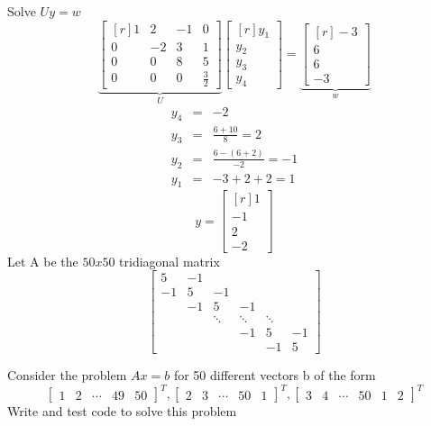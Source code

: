 \documentclass{jhwhw}
\begin{document}
Solve \(Uy = w\)
\[
   \underbrace{\begin{bmatrix*}[r]
	  1     &    2    &    -1   &  0 \\
	  0     &   -2    &     3   &  1 \\
	  0     &    0    &     8   &  5 \\
	  0     &    0    &     0   &  \frac{3}{2} 
	\end{bmatrix*}}_{U}
	\begin{bmatrix*}[r]
	   y_1  \\
	   y_2  \\
	   y_3  \\
	   y_4 
	\end{bmatrix*}
	 =
	\underbrace{\begin{bmatrix*}[r]
	   -3  \\
	    6  \\
	    6  \\
	   -3 
	 \end{bmatrix*}}_{w}
\]
\begin{eqnarray*}
  y_4 &=& -2 \nonumber \\
  y_3 &=& \frac{6+10}{8}  = 2\nonumber \\
  y_2 &=& \frac{6 - (6+2)}{-2}  = -1\nonumber \\
  y_1 &=& -3 + 2 + 2 = 1\nonumber 
\end{eqnarray*}
\[
y
	 =
	\begin{bmatrix*}[r]
	    1  \\
	   -1  \\
	    2  \\
	   -2 
	 \end{bmatrix*}
\]
\problem{}
Let A be the \(50x50\) tridiagonal matrix
\[
\begin{bmatrix*}
 5& -1 &  &  &  & \\ 
-1 & 5 & -1 &  &  &\\ 
  & -1 & 5 & -1 &  &\\ 
 &  &  \ddots & \ddots & \ddots & \\ 
 &  &  & -1 & 5 & -1 \\ 
 &  &  &  &  -1 & 5
\end{bmatrix*}
\]

Consider the problem \(Ax=b\) for 50 different vectors b of the form
\[
\begin{bmatrix*}
1 &2 &\cdots &49 &50 
\end{bmatrix*}^{T},
\begin{bmatrix*}
2 &3 &\cdots &50 &1 
\end{bmatrix*}^{T},
\begin{bmatrix*}
3 &4 &\cdots &50 &1 & 2 
\end{bmatrix*}^{T}
\]
Write and test code to solve this problem
\solution



\end{document}
